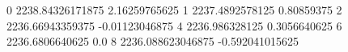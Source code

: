 0 2238.84326171875 2.16259765625
1 2237.4892578125 0.80859375
2 2236.66943359375 -0.01123046875
4 2236.986328125 0.3056640625
6 2236.6806640625 0.0
8 2236.088623046875 -0.592041015625
